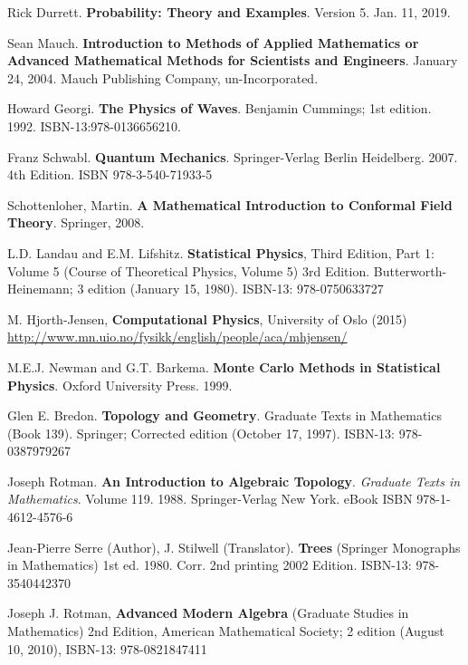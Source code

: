 Rick Durrett. \textbf{Probability: Theory and Examples}. Version 5. Jan. 11, 2019.

Sean Mauch. \textbf{Introduction to Methods of Applied Mathematics or Advanced Mathematical Methods for Scientists and Engineers}. January 24, 2004. Mauch Publishing Company, un-Incorporated. 

Howard Georgi. \textbf{The Physics of Waves}. Benjamin Cummings; 1st edition. 1992. ISBN-13:978-0136656210.


Franz Schwabl. \textbf{Quantum Mechanics}. Springer-Verlag Berlin Heidelberg. 2007. 4th Edition. ISBN 978-3-540-71933-5

Schottenloher, Martin.  \textbf{A Mathematical Introduction to Conformal Field Theory}.  Springer, 2008.  

L.D. Landau and E.M. Lifshitz.  \textbf{Statistical Physics}, Third Edition, Part 1: Volume 5 (Course of Theoretical Physics, Volume 5) 3rd Edition.  Butterworth-Heinemann; 3 edition (January 15, 1980).  ISBN-13: 978-0750633727

M. Hjorth-Jensen, \textbf{Computational Physics}, University of Oslo (2015) \url{http://www.mn.uio.no/fysikk/english/people/aca/mhjensen/}



M.E.J. Newman and G.T. Barkema.  \textbf{Monte Carlo Methods in Statistical Physics}.  Oxford University Press.  1999.  


Glen E. Bredon.  \textbf{Topology and Geometry}. Graduate Texts in Mathematics (Book 139).  Springer; Corrected edition (October 17, 1997).  ISBN-13: 978-0387979267

Joseph Rotman. \textbf{An Introduction to Algebraic Topology}. \emph{Graduate Texts in Mathematics}. Volume 119. 1988. Springer-Verlag New York. eBook ISBN
978-1-4612-4576-6

Jean-Pierre Serre (Author), J. Stilwell (Translator).  \textbf{Trees} (Springer Monographs in Mathematics) 1st ed. 1980. Corr. 2nd printing 2002 Edition.  ISBN-13: 978-3540442370

Joseph J. Rotman, \textbf{Advanced Modern Algebra} (Graduate Studies in Mathematics) 2nd Edition, American Mathematical Society; 2 edition (August 10, 2010), ISBN-13: 978-0821847411

